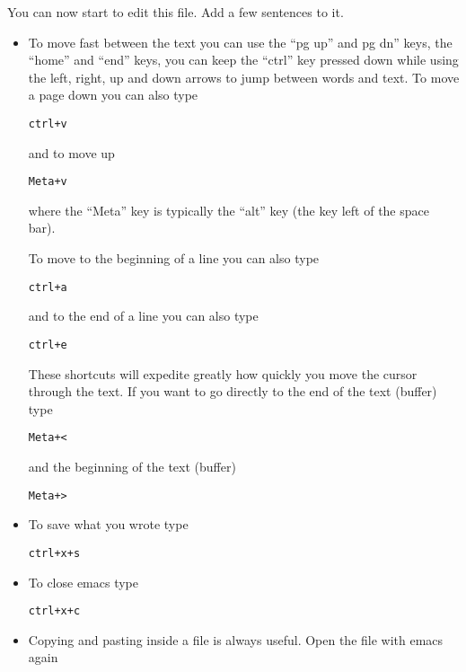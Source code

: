 \documentclass[aps,showpacs,prd,notitlepage,preprintnumbers,amsmath,amssymb,letterpaper]{revtex4}
\begin{document}
You can now start to edit this file. Add a few sentences to it.
\begin{itemize}

\item To move fast between the text you can use the ``pg up'' and pg
  dn'' keys, the ``home'' and ``end'' keys, you can keep the ``ctrl''
  key pressed down while using the left, right, up and down arrows to jump
  between words and text. To move a page down you can also type

\begin{verbatim}
ctrl+v
\end{verbatim}

and to move up

\begin{verbatim}
Meta+v
\end{verbatim}

where the ``Meta'' key is typically the ``alt'' key (the key left of the space bar).

To move to the beginning of a line you can also type
\begin{verbatim}
ctrl+a
\end{verbatim}

and to the end of a line you can also type
\begin{verbatim}
ctrl+e
\end{verbatim}


These shortcuts will expedite greatly how quickly you move the cursor
through the text. If you want to go directly to the end of the text (buffer)
type

\begin{verbatim}
Meta+<
\end{verbatim}

and the beginning of the text (buffer)

\begin{verbatim}
Meta+>
\end{verbatim}

  
\item To save what you wrote type 

\begin{verbatim}
ctrl+x+s
\end{verbatim}

\item To close emacs type

\begin{verbatim}
ctrl+x+c
\end{verbatim}

\item Copying and pasting inside a file is always useful. Open the file with emacs again


\end{itemize}
\end{document}
